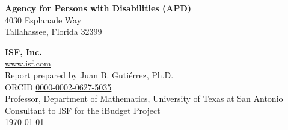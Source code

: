 \begin{flushleft}

\phantom{ghost text}

\vspace{\fill}

\noindent \textbf{Agency for Persons with Disabilities (APD)} \\
4030 Esplanade Way \\
Tallahassee, Florida 32399

\vspace{1cm}
\noindent \textbf{ISF, Inc.} \\
\href{https://www.isf.com}{www.isf.com} \\
Report prepared by Juan B. Gutiérrez, Ph.D.\\
ORCID \href{https://orcid.org/0000-0002-0627-5035}{0000-0002-0627-5035} \\
Professor, Department of  Mathematics, University of Texas at San Antonio\\
Consultant to ISF for the iBudget Project\\
\today
\end{flushleft}





\tableofcontents

\newpage


